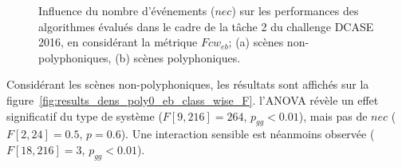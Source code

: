 \begin{figure}[t]
        \myfloatalign
        \par
        \par
       \caption[Influence du nombre d'événements ($nec$) sur les performances des algorithmes évalués dans le cadre de la tâche 2 du challenge DCASE 2016, en considérant la métrique $Fcw_{eb}$.]{Influence du nombre d'événements ($nec$) sur les performances des algorithmes évalués dans le cadre de la tâche 2 du challenge DCASE 2016, en considérant la métrique $Fcw_{eb}$; (a) scènes non-polyphoniques, (b) scènes polyphoniques.}\label{fig:results_dens_eb_class_wise_F}
\end{figure}

Considérant les scènes non-polyphoniques, les résultats sont affichés sur la figure~\ref{fig:results_dens_poly0_eb_class_wise_F}. l'ANOVA révèle un effet significatif du type de système ($F[9,216]=264$, $p_{gg}<0.01$), mais pas de $nec$ ($F[2,24]=0.5$, $p=0.6$). Une interaction sensible est néanmoins observée ($F[18,216]=3$, $p_{gg}<0.01$).


